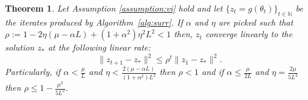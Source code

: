 \documentclass{article} %
\newtheorem{theorem}{Theorem}[section]
\theoremstyle{definition}
\newcommand{\nnumbers}{\mathbb{N}}
\begin{document}
{
\renewcommand{\thetheorem}{\ref{thm:det}}
\begin{theorem}
    Let Assumption \ref{assumption:vi} hold and let $\{z_t = g(\theta_t)\}_{t\in \nnumbers}$ be  the iterates produced by Algorithm~\ref{alg:surr}. If $\alpha$ and $\eta$ are picked  such that
$
\rho:= 1-2\eta(\mu-\alpha L) + (1+\alpha^2)\eta^2 L^2 <1 
$ then, $z_t$ converge linearly to the solution $z_\ast$ at the following linear rate:
\begin{equation}
    \|z_{t+1} -z_*\|^2 \leq \rho^t \|z_1-z_*\|^2.
\end{equation}Particularly, if $\alpha< \frac{\mu}{L}$ and $\eta < \frac{2 (\mu-\alpha L)}{(1+\alpha^2)L^2}$ then $\rho <1$ and if
$\alpha \leq \frac{\mu}{2L}$ and $\eta = \frac{2\mu}{5L^2}$ then $\rho \leq 1 - \frac{\mu^2}{5L^2}$.
\end{theorem}
}
\end{document}
